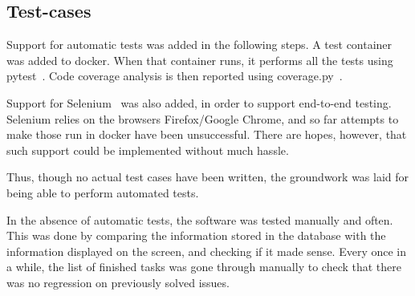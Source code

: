 \newpage

\subsection{Test-cases}

Support for automatic tests was added in the following steps. A test container
was added to docker. When that container runs, it performs all the tests
using pytest~\cite{pytest}. Code coverage analysis is then reported using
coverage.py~\cite{coverage}.

Support for Selenium~\cite{selenium} was also added, in order to support
end-to-end testing. Selenium relies on the browsers Firefox/Google Chrome,
and so far attempts to make those run in docker have been unsuccessful. There
are hopes, however, that such support could be implemented without much hassle.

Thus, though no actual test cases have been written, the groundwork was laid
for being able to perform automated tests.

In the absence of automatic tests, the software was tested manually and often.
This was done by comparing the information stored in the database with the
information displayed on the screen, and checking if it made sense. Every
once in a while, the list of finished tasks was gone through manually to
check that there was no regression on previously solved issues.

